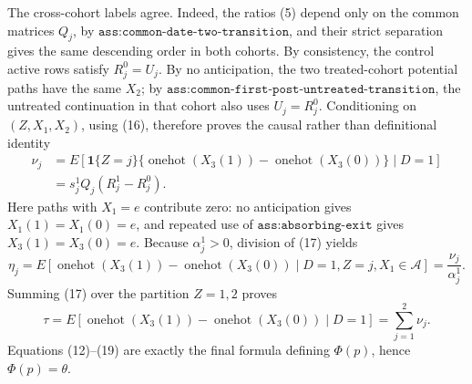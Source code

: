 The cross-cohort labels agree.  Indeed, the ratios (5) depend only on the common matrices \(Q_j\), by \(\texttt{ass:common-date-two-transition}\), and their strict separation gives the same descending order in both cohorts.  By consistency, the control active rows satisfy \(R_j^0=U_j\).  By no anticipation, the two treated-cohort potential paths have the same \(X_2\); by \(\texttt{ass:common-first-post-untreated-transition}\), the untreated continuation in that cohort also uses \(U_j=R_j^0\).  Conditioning on \((Z,X_1,X_2)\), using (16), therefore proves the causal rather than definitional identity
\[
 \begin{aligned}
 \nu_j
 &=E\!\left[\mathbf 1\{Z=j\}
  \{\operatorname{onehot}(X_3(1))-\operatorname{onehot}(X_3(0))\}
  \mid D=1\right]\\
 &=s_j^1Q_j(R_j^1-R_j^0).
 \end{aligned}                                               \tag{17}
\]
Here paths with \(X_1=e\) contribute zero: no anticipation gives \(X_1(1)=X_1(0)=e\), and repeated use of \(\texttt{ass:absorbing-exit}\) gives \(X_3(1)=X_3(0)=e\).  Because \(\alpha_j^1>0\), division of (17) yields
\[
 \eta_j
 =E\!\left[\operatorname{onehot}(X_3(1))-\operatorname{onehot}(X_3(0))
 \mid D=1,Z=j,X_1\in\mathcal A\right]
 =\frac{\nu_j}{\alpha_j^1}.                                \tag{18}
\]
Summing (17) over the partition \(Z=1,2\) proves
\[
 \tau
 =E\!\left[\operatorname{onehot}(X_3(1))-\operatorname{onehot}(X_3(0))\mid D=1\right]
 =\sum_{j=1}^2\nu_j.                                       \tag{19}
\]
Equations (12)--(19) are exactly the final formula defining \(\Phi(p)\), hence \(\Phi(p)=\theta\).


